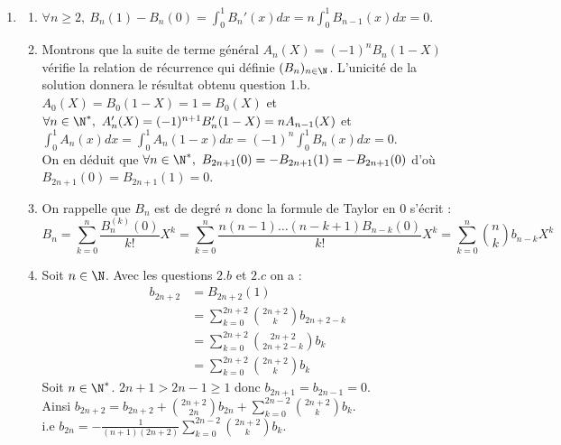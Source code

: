 \documentclass{book}
\begin{document}
\begin{enumerate}[leftmargin=*]
\begin{enumerate}[label=\alph*.]
			On a $\P(0)$. Supposons $\P(n-1)$ pour un certain $n\in \N^*$. Alors $\deg B_n'=\deg nB_{n-1}=n-1$. Donc $\P(n)$.\\
			Par récurrence, $\forall n\in \N,\ \deg B_n=n$.
		\end{enumerate}
		\item 
		\begin{enumerate}[label=\alph*.]
			\item $\forall n\geq 2,\ B_n(1)-B_n(0)=\displaystyle\int_0^1B_n'(x)dx=n\int_0^1B_{n-1}(x)dx=0$.
			\item Montrons que la suite de terme général $A_n(X)=(-1)^nB_n(1-X)$ vérifie la relation de récurrence qui définie $(B_n)_{n\in \N}$. L'unicité de la solution donnera le résultat obtenu question 1.b.\\
			$A_0(X)=B_0(1-X)=1=B_0(X)$ et $\forall n\in \N^*,\ A_n'(X)=(-1)^{n+1}B_n'(1-X)=nA_{n-1}(X)$ et $\displaystyle\int_0^1A_n(x)dx=\int_0^1A_n(1-x)dx=(-1)^n\int_0^1B_n(x)dx=0$.\\
			On en déduit que $\forall n\in \N^*,\ B_{2n+1}(0)=-B_{2n+1}(1)=-B_{2n+1}(0)$ d'où $B_{2n+1}(0)=B_{2n+1}(1)=0$.
			\item On rappelle que $B_n$ est de degré $n$ donc la formule de Taylor en $0$ s'écrit :
			$$B_n=\sum_{k=0}^n\frac{B_n^{(k)}(0)}{k!}X^k=\sum_{k=0}^n\frac{n(n-1)\dots(n-k+1)B_{n-k}(0)}{k!}X^k=\sum_{k=0}^n\binom{n}{k}b_{n-k}X^k$$
			\item Soit $n\in \N$. Avec les questions $2.b$ et $2.c$ on a :\\
			\begin{align*}
				b_{2n+2}&=B_{2n+2}(1)\\
				&=\sum_{k=0}^{2n+2}\binom{2n+2}{k}b_{2n+2-k}\\
				&=\sum_{k=0}^{2n+2}\binom{2n+2}{2n+2-k}b_k\\
				&=\sum_{k=0}^{2n+2}\binom{2n+2}{k}b_k
			\end{align*}
			Soit $n\in \N^*$. $2n+1>2n-1\geq 1$ donc $b_{2n+1}=b_{2n-1}=0$.\\
			Ainsi $b_{2n+2}=b_{2n+2}+\displaystyle\binom{2n+2}{2n}b_{2n}+\sum_{k=0}^{2n-2}\binom{2n+2}{k}b_k$.\\
			i.e $b_{2n}=-\displaystyle\frac{1}{(n+1)(2n+2)}\sum_{k=0}^{2n-2}\binom{2n+2}{k}b_k$.
		\end{enumerate}
	\end{enumerate}
	
\end{document}
